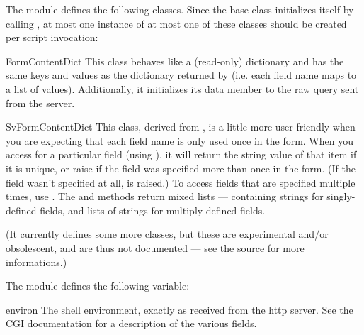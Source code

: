 The module defines the following classes.  Since the base class
initializes itself by calling , at most one instance of
at most one of these classes should be created per script invocation:

\begin{funcdesc}{FormContentDict}{}
This class behaves like a (read-only) dictionary and has the same keys
and values as the dictionary returned by  (i.e. each
field name maps to a list of values).  Additionally, it initializes
its data member  to the raw query sent from the
server.
\end{funcdesc}

\begin{funcdesc}{SvFormContentDict}{}
This class, derived from , is a little more
user-friendly when you are expecting that each field name is only used
once in the form.  When you access for a particular field (using
), it will return the string value of that item
if it is unique, or raise  if the field was specified
more than once in the form.  (If the field wasn't specified at all,
 is raised.)  To access fields that are specified
multiple times, use .  The
 and  methods return mixed lists ---
containing strings for singly-defined fields, and lists of strings for
multiply-defined fields.
\end{funcdesc}

(It currently defines some more classes, but these are experimental
and/or obsolescent, and are thus not documented --- see the source for
more informations.)

The module defines the following variable:

\begin{datadesc}{environ}
The shell environment, exactly as received from the http server.  See
the CGI documentation for a description of the various fields.
\end{datadesc}
